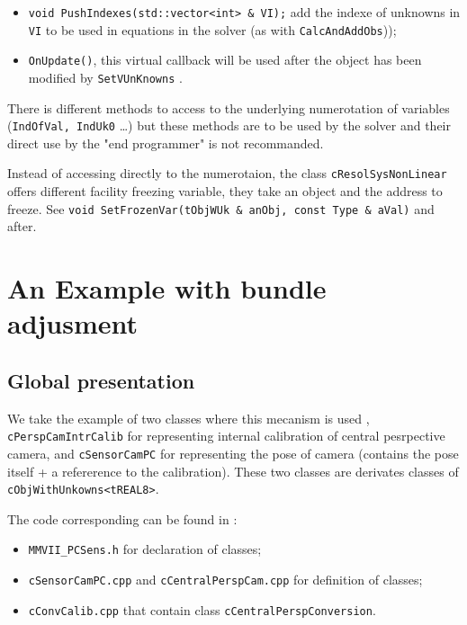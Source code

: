 \begin{itemize}
   \item    {\tt void PushIndexes(std::vector<int> \& VI);}  add the indexe of unknowns in  {\tt VI}
            to be used in equations in the solver (as with {\tt CalcAndAddObs}));

   \item    {\tt OnUpdate()}, this virtual callback will be used after the object has been
            modified by   {\tt SetVUnKnowns} .

\end{itemize}

There is different methods to access to the underlying numerotation of variables
({\tt IndOfVal, IndUk0} \dots) but these methods are to be used by the solver and their
direct use by the "end programmer" is not recommanded.

Instead of accessing directly to the numerotaion, the class {\tt cResolSysNonLinear}
 offers different facility freezing variable, they  take an object and the address to freeze.
See {\tt void SetFrozenVar(tObjWUk \& anObj, const Type \& aVal)} and after.


\section{An Example  with bundle adjusment}

\subsection{Global presentation}

We take the example of two classes where this mecanism is used ,
{\tt cPerspCamIntrCalib} for representing internal calibration of central pesrpective
camera, and {\tt cSensorCamPC}  for representing the pose of camera (contains
the pose itself + a refererence to the calibration).
These two classes are derivates classes of {\tt cObjWithUnkowns<tREAL8>}.

The code corresponding can be found in :

\begin{itemize}
   \item {\tt MMVII\_PCSens.h} for declaration of classes;

   \item {\tt cSensorCamPC.cpp}  and {\tt cCentralPerspCam.cpp} for definition of classes;

   \item {\tt cConvCalib.cpp}  that contain  class {\tt cCentralPerspConversion}.
\end{itemize}


